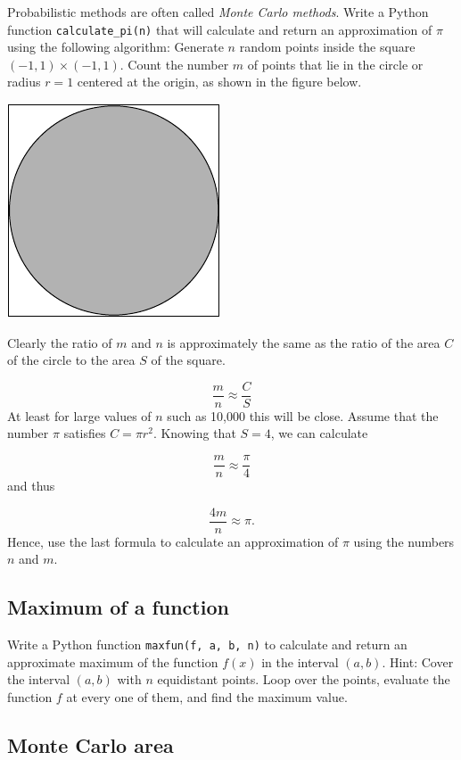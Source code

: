 Probabilistic methods are often called {\em Monte Carlo methods}. 
Write a Python function {\tt calculate\_pi(n)} that will calculate and return 
an approximation of $\pi$ using the following algorithm: Generate $n$ random points 
inside the square $(-1, 1)\times(-1, 1)$. Count the number $m$ of points that 
lie in the circle or radius $r = 1$ centered at the origin, as shown in the 
figure below.

\begin{center}
\includegraphics[height=0.3\textwidth]{img/prob1.pdf}
\end{center}
\noindent
Clearly the ratio of 
$m$ and $n$ is approximately the same as the ratio of the area $C$ of the circle 
to the area $S$ of the square. 

$$
\frac{m}{n} \approx \frac{C}{S}
$$
At least for large values of $n$ such as 10,000 this will be close. 
Assume that the number $\pi$ satisfies $C = \pi r^2$. Knowing that $S = 4$, 
we can calculate

$$
\frac{m}{n} \approx \frac{\pi}{4}
$$ 
and thus 

$$
\frac{4m}{n} \approx \pi.
$$ 
Hence, use the last formula to calculate an approximation of $\pi$ using 
the numbers $n$ and $m$.


\subsection{Maximum of a function}\label{exe:maximum}

Write a Python function {\tt maxfun(f, a, b, n)} to calculate and return  
an approximate maximum of the function $f(x)$ in the interval $(a, b)$. Hint:
Cover the interval $(a, b)$ with $n$ equidistant points. Loop over the 
points, evaluate the function $f$ at every one of them, and find the maximum 
value.


\subsection{Monte Carlo area}

